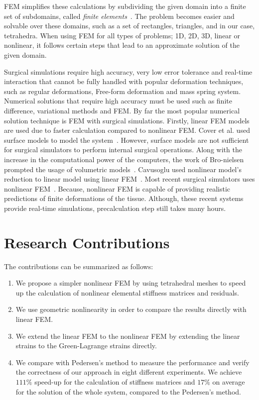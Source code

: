 FEM simplifies these calculations by subdividing the given domain into a finite set of subdomains, called \textit{finite elements}~\cite{Reddy93}. The problem becomes easier and solvable over these domains, such as a set of rectangles, triangles, and in our case, tetrahedra. When using FEM for all types of problems; 1D, 2D, 3D, linear or nonlinear, it follows certain steps that lead to an approximate solution of the given domain.

Surgical simulations require high accuracy, very low error tolerance and real-time interaction that cannot be fully handled with popular deformation techniques, such as regular deformations, Free-form deformation and mass spring system. Numerical solutions that require high accuracy must be used such as finite difference, variational methods and FEM. By far the most popular numerical solution technique is FEM with surgical simulations. Firstly, linear FEM models are used due to faster calculation compared to nonlinear FEM. Cover et al. used surface models to model the system~\cite{Cover93}. However, surface models are not sufficient for surgical simulators to perform internal surgical operations. Along with the increase in the computational power of the computers, the work of Bro-nielsen prompted the usage of volumetric models~\cite{Bro96}. Cavusoglu used nonlinear model's reduction to linear model using linear FEM~\cite{Cavusoglu00}. Most recent surgical simulators uses nonlinear FEM~\cite{Taylor07,Horton2010}. Because, nonlinear FEM is capable of providing realistic predictions of finite deformations of the tissue. Although, these recent systems provide real-time simulations, precalculation step still takes many hours.

\section{Research Contributions}

The contributions can be summarized as follows:

\begin{enumerate}
\item We propose a simpler nonlinear FEM by using tetrahedral meshes to speed up the calculation of nonlinear elemental stiffness matrices and residuals.
\item We use geometric nonlinearity in order to compare the results directly with linear FEM.
\item We extend the linear FEM to the nonlinear FEM by extending the linear strains to the Green-Lagrange strains directly.
\item We compare with Pedersen's method to measure the performance and verify the correctness of our approach in eight different experiments. We achieve $111\%$ speed-up for the calculation of stiffness matrices and $17\%$ on average for the solution of the whole system, compared to the Pedersen's method.
\end{enumerate}

